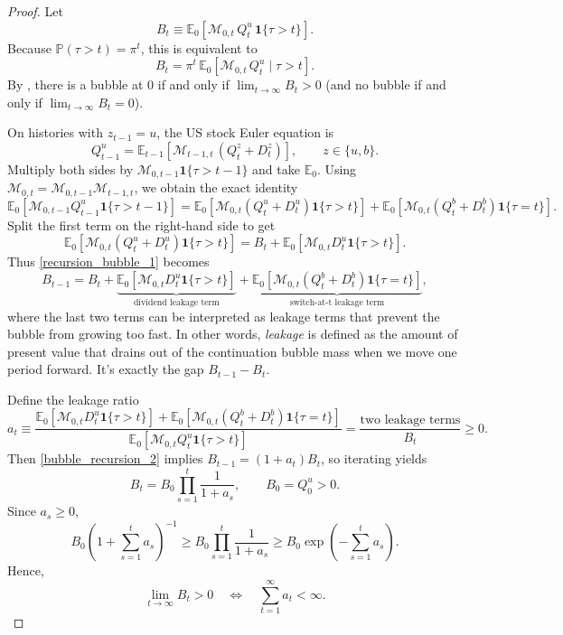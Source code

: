 \documentclass[12pt]{article}
\theoremstyle{plain}
\begin{document}
\begin{proof}
Let
\[
B_t \equiv \mathbb E_0\!\left[\mathcal M_{0,t}\,Q_t^u\,\mathbf 1\{\tau>t\}\right].
\]
Because $\mathbb P(\tau>t)=\pi^t$, this is equivalent to
\[
B_t=\pi^t\,\mathbb E_0\!\left[\mathcal M_{0,t}\,Q_t^u\mid \tau>t\right].
\]
By , there is a bubble at $0$ if and only if $\lim_{t\to\infty}B_t>0$ (and no bubble if and only if $\lim_{t\to\infty}B_t=0$).

On histories with $z_{t-1}=u$, the US stock Euler equation is
\[
Q_{t-1}^u
=\mathbb E_{t-1}\!\left[\mathcal M_{t-1,t}\,(Q_t^{z}+D_t^{z})\right],
\qquad z\in\{u,b\}.
\]
Multiply both sides by $\mathcal M_{0,t-1}\mathbf 1\{\tau>t-1\}$ and take $\mathbb E_0$. Using
$\mathcal M_{0,t}=\mathcal M_{0,t-1}\mathcal M_{t-1,t}$, we obtain the exact identity
\begin{equation}\label{recursion_bubble_1}
\mathbb E_0\!\left[\mathcal M_{0,t-1}Q_{t-1}^u\mathbf 1\{\tau>t-1\}\right]
=
\mathbb E_0\!\left[\mathcal M_{0,t}(Q_t^u+D_t^u)\mathbf 1\{\tau>t\}\right]
+
\mathbb E_0\!\left[\mathcal M_{0,t}(Q_t^b+D_t^b)\mathbf 1\{\tau=t\}\right].
\end{equation}
Split the first term on the right-hand side to get
\[
\mathbb E_0\!\left[\mathcal M_{0,t}(Q_t^u+D_t^u)\mathbf 1\{\tau>t\}\right]
=
B_t+\mathbb E_0\!\left[\mathcal M_{0,t}D_t^u\mathbf 1\{\tau>t\}\right].
\]
Thus \eqref{recursion_bubble_1} becomes
\begin{equation}\label{bubble_recursion_2}
B_{t-1}
=
B_t
+\underbrace{\mathbb E_0\!\left[\mathcal M_{0,t}D_t^u\mathbf 1\{\tau>t\}\right]}_{\text{dividend leakage term}}
+\underbrace{\mathbb E_0\!\left[\mathcal M_{0,t}(Q_t^b+D_t^b)\mathbf 1\{\tau=t\}\right]}_{
	\text{switch-at-t leakage term}},
\end{equation}
where the last two terms can be interpreted as leakage terms that prevent the bubble from growing too fast. 
In other words, \textit{leakage} is defined as the amount of present value that drains out of the 
continuation bubble mass when we move one period forward. It’s exactly the gap $B_{t-1}-B_t$.

Define the leakage ratio
\[
a_t\equiv
\frac{
\mathbb E_0\!\left[\mathcal M_{0,t}D_t^u\mathbf 1\{\tau>t\}\right]
+\mathbb E_0\!\left[\mathcal M_{0,t}(Q_t^b+D_t^b)\mathbf 1\{\tau=t\}\right]
}{
\mathbb E_0\!\left[\mathcal M_{0,t}Q_t^u\mathbf 1\{\tau>t\}\right]
}
=\frac{\text{two leakage terms}}{B_t}\ge 0.
\]
Then \eqref{bubble_recursion_2} implies $B_{t-1}=(1+a_t)B_t$, so iterating yields
\[
B_t=B_0\prod_{s=1}^t\frac{1}{1+a_s},
\qquad B_0=Q_0^u>0.
\]
Since $a_s\ge 0$,
\[
B_0\left(1+\sum_{s=1}^t a_s\right)^{-1}
\ge B_0\prod_{s=1}^t\frac{1}{1+a_s}
\ge B_0\exp\!\left(-\sum_{s=1}^t a_s\right).
\]
Hence,
\[
\lim_{t\to\infty}B_t>0
\quad\Longleftrightarrow\quad
\sum_{t=1}^\infty a_t<\infty.
\]


\end{proof}
\end{document}
